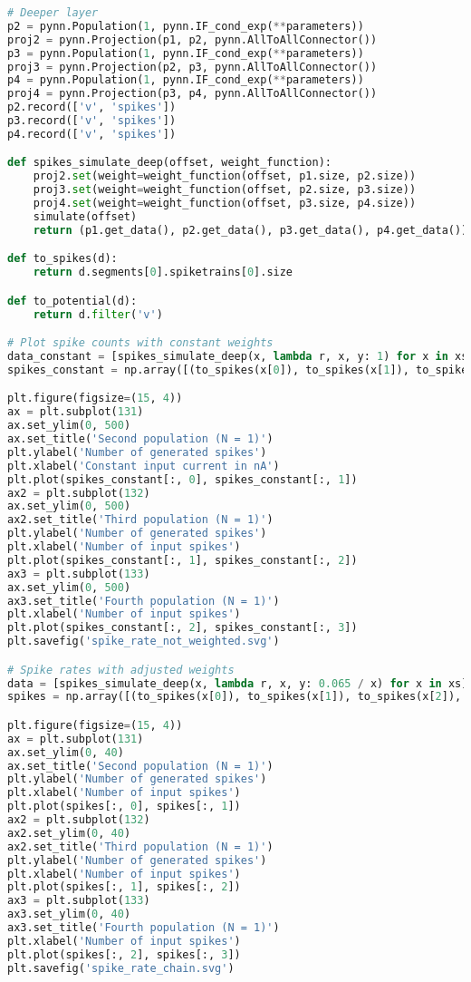 \begin{lstlisting}[language=Python]
# Deeper layer
p2 = pynn.Population(1, pynn.IF_cond_exp(**parameters))
proj2 = pynn.Projection(p1, p2, pynn.AllToAllConnector())
p3 = pynn.Population(1, pynn.IF_cond_exp(**parameters))
proj3 = pynn.Projection(p2, p3, pynn.AllToAllConnector())
p4 = pynn.Population(1, pynn.IF_cond_exp(**parameters))
proj4 = pynn.Projection(p3, p4, pynn.AllToAllConnector())
p2.record(['v', 'spikes'])
p3.record(['v', 'spikes'])
p4.record(['v', 'spikes'])

def spikes_simulate_deep(offset, weight_function):
    proj2.set(weight=weight_function(offset, p1.size, p2.size))
    proj3.set(weight=weight_function(offset, p2.size, p3.size))
    proj4.set(weight=weight_function(offset, p3.size, p4.size))
    simulate(offset)
    return (p1.get_data(), p2.get_data(), p3.get_data(), p4.get_data())

def to_spikes(d):
    return d.segments[0].spiketrains[0].size

def to_potential(d):
    return d.filter('v')

# Plot spike counts with constant weights
data_constant = [spikes_simulate_deep(x, lambda r, x, y: 1) for x in xs]
spikes_constant = np.array([(to_spikes(x[0]), to_spikes(x[1]), to_spikes(x[2]), to_spikes(x[3])) for x in data_constant])

plt.figure(figsize=(15, 4))
ax = plt.subplot(131)
ax.set_ylim(0, 500)
ax.set_title('Second population (N = 1)')
plt.ylabel('Number of generated spikes')
plt.xlabel('Constant input current in nA')
plt.plot(spikes_constant[:, 0], spikes_constant[:, 1])
ax2 = plt.subplot(132)
ax.set_ylim(0, 500)
ax2.set_title('Third population (N = 1)')
plt.ylabel('Number of generated spikes')
plt.xlabel('Number of input spikes')
plt.plot(spikes_constant[:, 1], spikes_constant[:, 2])
ax3 = plt.subplot(133)
ax.set_ylim(0, 500)
ax3.set_title('Fourth population (N = 1)')
plt.xlabel('Number of input spikes')
plt.plot(spikes_constant[:, 2], spikes_constant[:, 3])
plt.savefig('spike_rate_not_weighted.svg')

# Spike rates with adjusted weights
data = [spikes_simulate_deep(x, lambda r, x, y: 0.065 / x) for x in xs]
spikes = np.array([(to_spikes(x[0]), to_spikes(x[1]), to_spikes(x[2]), to_spikes(x[3])) for x in data])

plt.figure(figsize=(15, 4))
ax = plt.subplot(131)
ax.set_ylim(0, 40)
ax.set_title('Second population (N = 1)')
plt.ylabel('Number of generated spikes')
plt.xlabel('Number of input spikes')
plt.plot(spikes[:, 0], spikes[:, 1])
ax2 = plt.subplot(132)
ax2.set_ylim(0, 40)
ax2.set_title('Third population (N = 1)')
plt.ylabel('Number of generated spikes')
plt.xlabel('Number of input spikes')
plt.plot(spikes[:, 1], spikes[:, 2])
ax3 = plt.subplot(133)
ax3.set_ylim(0, 40)
ax3.set_title('Fourth population (N = 1)')
plt.xlabel('Number of input spikes')
plt.plot(spikes[:, 2], spikes[:, 3])
plt.savefig('spike_rate_chain.svg')
\end{lstlisting}

